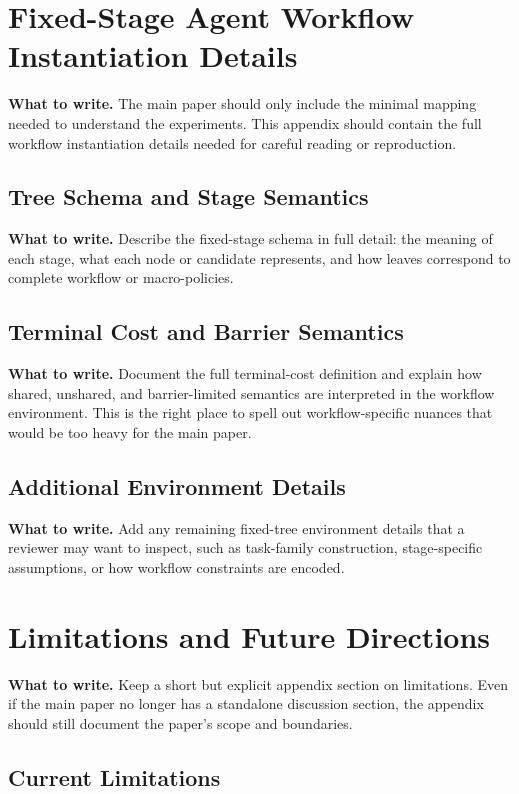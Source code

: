 \documentclass{article}
\newcommand{\towrite}[1]{\noindent\textbf{What to write.} #1}
\begin{document}
\section{Fixed-Stage Agent Workflow Instantiation Details}

\towrite{The main paper should only include the minimal mapping needed to understand the experiments. This appendix should contain the full workflow instantiation details needed for careful reading or reproduction.}

\subsection{Tree Schema and Stage Semantics}

\towrite{Describe the fixed-stage schema in full detail: the meaning of each stage, what each node or candidate represents, and how leaves correspond to complete workflow or macro-policies.}

\subsection{Terminal Cost and Barrier Semantics}

\towrite{Document the full terminal-cost definition and explain how shared, unshared, and barrier-limited semantics are interpreted in the workflow environment. This is the right place to spell out workflow-specific nuances that would be too heavy for the main paper.}

\subsection{Additional Environment Details}

\towrite{Add any remaining fixed-tree environment details that a reviewer may want to inspect, such as task-family construction, stage-specific assumptions, or how workflow constraints are encoded.}

\section{Limitations and Future Directions}

\towrite{Keep a short but explicit appendix section on limitations. Even if the main paper no longer has a standalone discussion section, the appendix should still document the paper's scope and boundaries.}

\subsection{Current Limitations}
\end{document}
